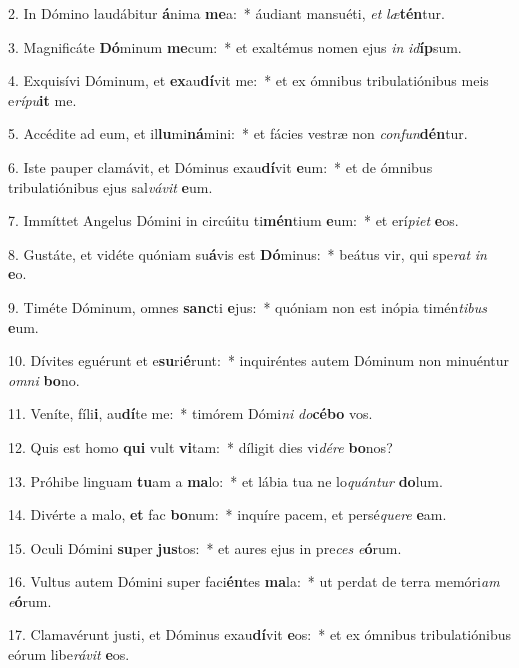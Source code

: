 2. In Dómino laudábitur \textbf{á}nima \textbf{me}a:~*  áudiant mansuéti, \textit{et} \textit{læ}\textbf{tén}tur.\

3. Magnificáte \textbf{Dó}minum \textbf{me}cum:~*  et exaltémus nomen ejus \textit{in} \textit{id}\textbf{íp}sum.\

4. Exquisívi Dóminum, et \textbf{ex}au\textbf{dí}vit me:~*  et ex ómnibus tribulatiónibus meis e\textit{rí}\textit{pu}\textbf{it} me.\

5. Accédite ad eum, et il\textbf{lu}mi\textbf{ná}mini:~*  et fácies vestræ non \textit{con}\textit{fun}\textbf{dén}tur.\

6. Iste pauper clamávit, et Dóminus exau\textbf{dí}vit \textbf{e}um:~*  et de ómnibus tribulatiónibus ejus sal\textit{vá}\textit{vit} \textbf{e}um.\

7. Immíttet Angelus Dómini in circúitu ti\textbf{mén}tium \textbf{e}um:~*  et erí\textit{pi}\textit{et} \textbf{e}os.\

8. Gustáte, et vidéte quóniam su\textbf{á}vis est \textbf{Dó}minus:~*  beátus vir, qui spe\textit{rat} \textit{in} \textbf{e}o.\

9. Timéte Dóminum, omnes \textbf{sanc}ti \textbf{e}jus:~*  quóniam non est inópia timén\textit{ti}\textit{bus} \textbf{e}um.\

10. Dívites eguérunt et e\textbf{su}ri\textbf{é}runt:~*  inquiréntes autem Dóminum non minuéntur \textit{om}\textit{ni} \textbf{bo}no.\

11. Veníte, fíli\textbf{i}, au\textbf{dí}te me:~*  timórem Dómi\textit{ni} \textit{do}\textbf{cé}\textbf{bo} vos.\

12. Quis est homo \textbf{qui} vult \textbf{vi}tam:~*  díligit dies vi\textit{dé}\textit{re} \textbf{bo}nos?\

13. Próhibe linguam \textbf{tu}am a \textbf{ma}lo:~*  et lábia tua ne lo\textit{quán}\textit{tur} \textbf{do}lum.\

14. Divérte a malo, \textbf{et} fac \textbf{bo}num:~*  inquíre pacem, et persé\textit{que}\textit{re} \textbf{e}am.\

15. Oculi Dómini \textbf{su}per \textbf{jus}tos:~*  et aures ejus in pre\textit{ces} \textit{e}\textbf{ó}rum.\

16. Vultus autem Dómini super faci\textbf{én}tes \textbf{ma}la:~*  ut perdat de terra memóri\textit{am} \textit{e}\textbf{ó}rum.\

17. Clamavérunt justi, et Dóminus exau\textbf{dí}vit \textbf{e}os:~*  et ex ómnibus tribulatiónibus eórum libe\textit{rá}\textit{vit} \textbf{e}os.\

